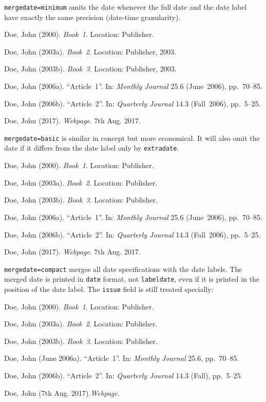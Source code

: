 \documentclass[a4paper]{article}
\newenvironment{bibsample}
  {\trivlist\samepage
   \setlength{\itemsep}{0pt}}
  {\endtrivlist}
\begin{document}
\texttt{mergedate=minimum} omits the date whenever the full date
and the date label have exactly the same precision (date-time granularity).

\begin{bibsample}
\item Doe, John (2000). \emph{Book~1}. Location: Publisher.
\item Doe, John (2003a). \emph{Book~2}. Location: Publisher, 2003.
\item Doe, John (2003b). \emph{Book~3}. Location: Publisher, 2003.
\item Doe, John (2006a). \enquote{Article~1}. In: \emph{Monthly Journal} 25.6
(June~2006), pp.~70--85.
\item Doe, John (2006b). \enquote{Article~2}. In: \emph{Quarterly Journal} 14.3
(Fall~2006), pp.~5--25.
\item Doe, John (2017). \emph{Webpage}. 7th Aug. 2017.
\end{bibsample}

\texttt{mergedate=basic} is similar in concept but more economical.
It will also omit the date if it differs from the date label only by
\texttt{extradate}.

\begin{bibsample}
\item Doe, John (2000). \emph{Book~1}. Location: Publisher.
\item Doe, John (2003a). \emph{Book~2}. Location: Publisher.
\item Doe, John (2003b). \emph{Book~3}. Location: Publisher.
\item Doe, John (2006a). \enquote{Article~1}. In: \emph{Monthly Journal} 25.6
(June~2006), pp.~70--85.
\item Doe, John (2006b). \enquote{Article~2}. In: \emph{Quarterly Journal} 14.3
(Fall~2006), pp.~5--25.
\item Doe, John (2017). \emph{Webpage}. 7th Aug. 2017.
\end{bibsample}

\texttt{mergedate=compact} merges all date specifications with the
date labels. The merged date is printed in \texttt{date} format,
not \texttt{labeldate}, even if it is printed in the position of
the date label. The \texttt{issue} field is still treated specially:

\begin{bibsample}
\item Doe, John (2000). \emph{Book~1}. Location: Publisher.
\item Doe, John (2003a). \emph{Book~2}. Location: Publisher.
\item Doe, John (2003b). \emph{Book~3}. Location: Publisher.
\item Doe, John (June 2006a). \enquote{Article~1}. In: \emph{Monthly Journal} 25.6, pp.~70--85.
\item Doe, John (2006b). \enquote{Article~2}. In: \emph{Quarterly Journal} 14.3
(Fall), pp.~5--25.
\item Doe, John (7th Aug. 2017).\emph{Webpage}.
\end{bibsample}
\end{document}
